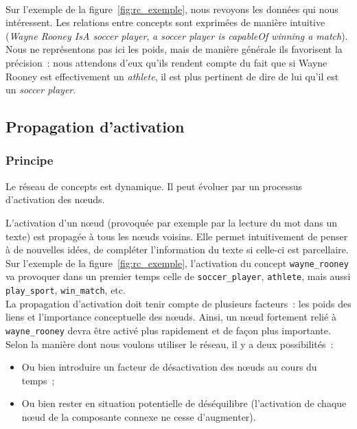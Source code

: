\documentclass[a4paper, 12pt]{article}
\begin{document}
\paragraph{}
Sur l'exemple de la figure~\ref{fig:rc_exemple}, nous revoyons les données qui nous intéressent. Les relations entre concepts sont exprimées de manière intuitive (\textit{Wayne Rooney IsA soccer player}, \textit{a soccer player is capableOf winning a match}). Nous ne représentons pas ici les poids, mais de manière générale ils favorisent la précision~: nous attendons d'eux qu'ils rendent compte du fait que si Wayne Rooney est effectivement un \textit{athlete}, il est plus pertinent de dire de lui qu'il est un \textit{soccer player}.


\subsection{Propagation d'activation}

\subsubsection{Principe}
Le réseau de concepts est dynamique. Il peut évoluer par un processus d'activation des n\oe{}uds.

L'activation d'un n\oe{}ud (provoquée par exemple par la lecture du mot dans un texte) est propagée à tous les n\oe{}uds voisins. Elle permet intuitivement de penser à de nouvelles idées, de compléter l'information du texte si celle-ci est parcellaire.\\

Sur l'exemple de la figure~\ref{fig:rc_exemple}, l'activation du concept \verb|wayne_rooney| va provoquer dans un premier temps celle de \verb|soccer_player|, \verb|athlete|, mais aussi \verb|play_sport|, \verb|win_match|, etc.\\

La propagation d'activation doit tenir compte de plusieurs facteurs~: les poids des liens et l'importance conceptuelle des n\oe{}uds. Ainsi, un n\oe{}ud fortement relié à \verb|wayne_rooney| devra être activé plus rapidement et de façon plus importante.\\

Selon la manière dont nous voulons utiliser le réseau, il y a deux possibilités~:
\begin{itemize}
  \item Ou bien introduire un facteur de désactivation des n\oe{}uds au cours du temps~;%
 \item Ou bien rester en situation potentielle de déséquilibre (l'activation de chaque n\oe{}ud de la composante connexe ne cesse d'augmenter).
\end{itemize}
\end{document}
